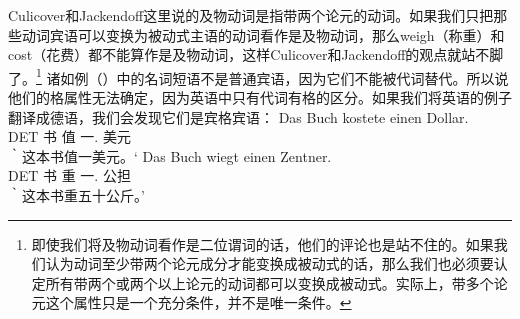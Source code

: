 Culicover和Jackendoff这里说的及物动词是指带两个论元的动词。如果我们只把那些动词宾语可以变换为被动式主语的动词看作是及物动词，那么weigh（称重）和cost（花费）都不能算作是及物动词，这样Culicover和Jackendoff的观点就站不脚了。\footnote{即使我们将及物动词看作是二位谓词的话，他们的评论也是站不住的。如果我们认为动词至少带两个论元成分才能变换成被动式的话，那么我们也必须要认定所有带两个或两个以上论元的动词都可以变换成被动式。实际上，带多个论元这个属性只是一个充分条件，并不是唯一条件。}
诸如例（）中的名词短语不是普通宾语，因为它们不能被代词替代。所以说他们的格属性无法确定，因为英语中只有代词有格的区分。如果我们将英语的例子翻译成德语，我们会发现它们是宾格宾语：
\eal
\ex 
\gll Das Buch kostete einen Dollar.\\
       DET 书 值 一.\acc{} 美元\\
\glt ｀这本书值一美元。‘
\ex 
\gll Das Buch wiegt einen Zentner.\\
     DET 书 重 一.\acc{} 公担\\
\glt ｀这本书重五十公斤。’
\zl


